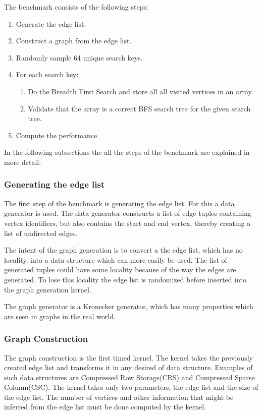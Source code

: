 The benchmark consists of the following steps:
\begin{enumerate}
	\item Generate the edge list.
	\item Construct a graph from the edge list.
	\item Randomly sample 64 unique search keys.
	\item For each search key:
	\begin{enumerate}
		\item Do the Breadth First Search and store all all visited vertices in an array.
		\item Validate that the array is a correct BFS search tree for the given search tree.
	\end{enumerate}
	\item Compute the performance
\end{enumerate}

In the following subsections the all the steps of the benchmark are explained in more detail.

\subsubsection{Generating the edge list}
The first step of the benchmark is generating the edge list. For this a data generator is used. The data generator constructs a list of edge tuples containing vertex identifiers, but also contains the start and end vertex, thereby creating a list of undirected edges.

The intent of the graph generation is to convert a the edge list, which has no locality, into a data structure which can more easily be used. The list of generated tuples could have some locality because of the way the edges are generated. To lose this locality the edge list is randomized before inserted into the graph generation kernel. 

The graph generator is a Kronecker generator, which has many properties which are seen in graphs in the real world\cite{leskovec2010kronecker}.

\subsubsection{Graph Construction}
The graph construction is the first timed kernel. The kernel takes the previously created edge list and transforms it in any desired of data structure. Examples of such data structures are Compressed Row Storage(CRS) and Compressed Sparse Column(CSC)\cite{ccs,crs}. The kernel takes only two parameters, the edge list and the size of the edge list. The number of vertices and other information that might be inferred from the edge list must be done computed by the kernel. 

